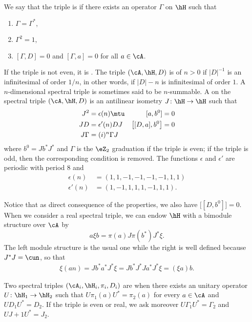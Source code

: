 We say that the triple is  if there exists an operator $\Gamma$ on $\hH$ such that
\begin{enumerate}
\item $\Gamma=\Gamma^*$,
\item $\Gamma^2=1$,
\item $[\Gamma,D]=0$ and $[\Gamma,a]=0$ for all $a\in\cA$.
\end{enumerate}
If the triple is not even, it is . The triple $(\cA,\hH,D)$ is of  $n>0$ if $| D |^{-1}$ is an infinitesimal of order $1/n$, in other words, if $| D |-n$ is infinitesimal of order $1$. A $n$-dimensional spectral triple is sometimes said to be $n$-summable. A  on the spectral triple $(\cA,\hH,D)$ is an antilinear isometry $J\colon \hH\to \hH$ such that
\begin{align*}
J^2&=\epsilon(n)\mtu	&[a,b^0]&=0\\
JD&=\epsilon'(n)DJ	&\big[ [D,a],b^0 \big]&=0\\
J\Gamma&=(i)^n\Gamma J
\end{align*}
where $b^0=Jb^*J^*$ and $\Gamma$ is the $\eZ_2$ graduation if the triple is even; if the triple is odd, then the corresponding condition is removed. The functions $\epsilon$ and $\epsilon'$ are periodic with period $8$ and
\[
\begin{split}
\epsilon(n)	&=(1,1,-1,-1,-1,-1,1,1)\\
\epsilon'(n)	&=(1,-1,1,1,1,-1,1,1).
\end{split}
\]

Notice that as direct consequence of the properties, we also have $\big[ [D,b^0] \big]=0$. When we consider a real spectral triple, we can endow $\hH$ with a bimodule structure over $\cA$ by
\[
  a\xi b=\pi(a)J\pi(b^*)J^*\xi.
\]
The left module structure is the usual one while the right is well defined because $J^*J=\cun$, so that
\begin{align*}
\xi(an)=Jb^*a^*J^*\xi=Jb^*J^*Ja^*J^*\xi=(\xi a)b.
\end{align*}

Two spectral triples $(\cA_i,\hH_i,\pi_i,D_i)$ are  when there exists an unitary operator $U\colon \hH_1\to \hH_2$ such that $U\pi_1(a)U^*=\pi_2(a)$ for every $a\in\cA$ and $UD_1U^*=D_2$. If the triple is even or real, we ask moreover $U\Gamma_1U^*=\Gamma_2$ and $UJ+1U^*=J_2$.

